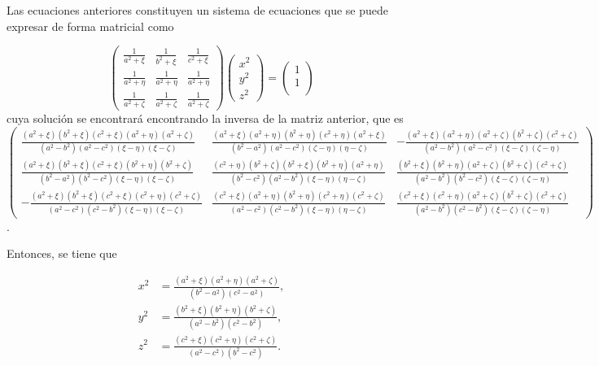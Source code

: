 Las ecuaciones anteriores constituyen un sistema de ecuaciones que se puede expresar de forma matricial como

\begin{equation*}
    \begin{pmatrix}
    \frac{1}{a^2+\xi} & \frac{1}{b^2+\xi} & \frac{1}{c^2+\xi}\\
    \frac{1}{a^2+\eta} & \frac{1}{a^2+\eta} & \frac{1}{a^2+\eta}\\
    \frac{1}{a^2+\zeta} & \frac{1}{a^2+\zeta} & \frac{1}{a^2+\zeta}\end{pmatrix}\begin{pmatrix}
        x^2\\
        y^2\\
        z^2
    \end{pmatrix}=\begin{pmatrix}
        1\\
        1\\
    \end{pmatrix}
\end{equation*}
cuya solución se encontrará encontrando la inversa de la matriz anterior, que es \cite{Miguel}
\begin{equation*}
    \begin{pmatrix}
        \frac{(a^2+\xi)(b^2+\xi)(c^2+\xi)(a^2+\eta)(a^2+\zeta)}{(a^2-b^2)(a^2-c^2)(\xi-\eta)(\xi-\zeta)} & \frac{(a^2+\xi)(a^2+\eta)(b^2+\eta)(c^2+\eta)(a^2+\xi)}{(b^2-a^2)(a^2-c^2)(\zeta-\eta)(\eta-\zeta)} & -\frac{(a^2+\xi)(a^2+\eta)(a^2+\zeta)(b^2+\zeta)(c^2+\zeta)}{(a^2-b^2)(a^2-c^2)(\xi-\zeta)(\zeta-\eta)}\\
        \frac{(a^2+\xi)(b^2+\xi)(c^2+\xi)(b^2+\eta)(b^2+\zeta)}{(b^2-a^2)(b^2-c^2)(\xi-\eta)(\xi-\zeta)} &\frac{(c^2+\eta)(b^2+\zeta)(b^2+\xi)(b^2+\eta)(a^2+\eta)}{(b^2-c^2)(a^2-b^2)(\xi-\eta)(\eta-\zeta)} &\frac{(b^2+\xi)(b^2+\eta)(a^2+\zeta)(b^2+\zeta)(c^2+\zeta)}{(a^2-b^2)(b^2-c^2)(\xi-\zeta)(\zeta-\eta)}\\
        -\frac{(a^2+\xi)(b^2+\xi)(c^2+\xi)(c^2+\eta)(c^2+\zeta)}{(a^2-c^2)(c^2-b^2)(\xi-\eta)(\xi-\zeta)} & \frac{(c^2+\xi)(a^2+\eta)(b^2+\eta)(c^2+\eta)(c^2+\zeta)}{(a^2-c^2)(c^2-b^2)(\xi-\eta)(\eta-\zeta)} &
        \frac{(c^2+\xi)(c^2+\eta)(a^2+\zeta)(b^2+\zeta)(c^2+\zeta)}{(a^2-b^2)(c^2-b^2)(\xi-\zeta)(\zeta-\eta)}
    \end{pmatrix}
\end{equation*}.

Entonces, se tiene que

\begin{align}
    x^2&=\frac{(a^2+\xi)(a^2+\eta)(a^2+\zeta)}{(b^2-a^2)(c^2-a^2)},\label{def_x}\\
     y^2&=\frac{(b^2+\xi)(b^2+\eta)(b^2+\zeta)}{(a^2-b^2)(c^2-b^2)},\\
     z^2&=\frac{(c^2+\xi)(c^2+\eta)(c^2+\zeta)}{(a^2-c^2)(b^2-c^2)}.    
\end{align}

